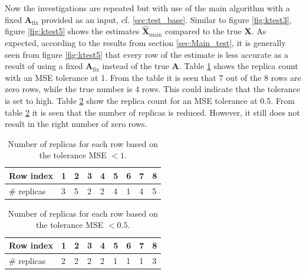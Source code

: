Now the investigations are repeated but with use of the main algorithm with a fixed $\mathbf{A}_{\text{fix}}$ provided as an input, cf. \ref{sec:test_base}.
Similar to figure \ref{fig:ktest3}, figure \ref{fig:ktest5} shows the estimates $\hat{\mathbf{X}}_{\text{main}}$ compared to the true $\mathbf{X}$. 
As expected, according to the results from section \ref{sec:Main_test}, it is generally seen from figure \ref{fig:ktest5} that every row of the estimate is less accurate as a result of using a fixed $\mathbf{A}_{\text{fix}}$ instead of the true $\mathbf{A}$. 
Table \ref{tab:replica5} shows the replica count with an MSE tolerance at 1. 
From the table it is seen that 7 out of the 8 rows are zero rows, while the true number is 4 rows. 
This could indicate that the tolerance is set to high. 
Table \ref{tab:replica6} show the replica count for an MSE tolerance at 0.5. 
From table \ref{tab:replica6} it is seen that the number of replicas is reduced.
However, it still does not result in the right number of zero rows.  
\begin{table}[H]
\center
\begin{tabular}{|l|l|l|l|l|l|l|l|l|}
\hline
Row index   & 1 & 2 & 3 & 4 & 5 & 6 & 7 & 8 \\ \hline
\# replicas & 3 & 5 & 2 & 2 & 4 & 1 & 4 & 5 \\ \hline
\end{tabular}
\caption{Number of replicas for each row based on the tolerance MSE $< 1$.}
\label{tab:replica5}
\end{table}
\noindent
\begin{table}[H]
\center
\begin{tabular}{|l|l|l|l|l|l|l|l|l|}
\hline
Row index   & 1 & 2 & 3 & 4 & 5 & 6 & 7 & 8 \\ \hline
\# replicas & 2 & 2 & 2 & 2 & 1 & 1 & 1 & 3 \\ \hline
\end{tabular}
\caption{Number of replicas for each row based on the tolerance MSE $< 0.5$.}
\label{tab:replica6}
\end{table}
\noindent
